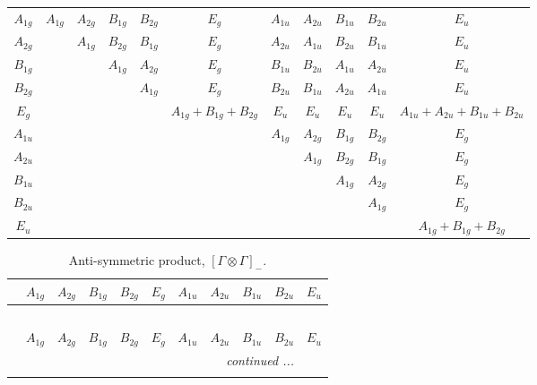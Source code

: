 \documentclass[fleqn,10pt,landscape]{article}
\begin{document}
\begin{itemize}
\begin{center}
\begin{longtable}{c|cccccccccc}
$ A_{1g} $ & $ A_{1g} $ & $ A_{2g} $ & $ B_{1g} $ & $ B_{2g} $ & $ E_{g} $ & $ A_{1u} $ & $ A_{2u} $ & $ B_{1u} $ & $ B_{2u} $ & $ E_{u} $ \\
$ A_{2g} $ & $  $ & $ A_{1g} $ & $ B_{2g} $ & $ B_{1g} $ & $ E_{g} $ & $ A_{2u} $ & $ A_{1u} $ & $ B_{2u} $ & $ B_{1u} $ & $ E_{u} $ \\
$ B_{1g} $ & $  $ & $  $ & $ A_{1g} $ & $ A_{2g} $ & $ E_{g} $ & $ B_{1u} $ & $ B_{2u} $ & $ A_{1u} $ & $ A_{2u} $ & $ E_{u} $ \\
$ B_{2g} $ & $  $ & $  $ & $  $ & $ A_{1g} $ & $ E_{g} $ & $ B_{2u} $ & $ B_{1u} $ & $ A_{2u} $ & $ A_{1u} $ & $ E_{u} $ \\
$ E_{g} $ & $  $ & $  $ & $  $ & $  $ & $ A_{1g} + B_{1g} + B_{2g} $ & $ E_{u} $ & $ E_{u} $ & $ E_{u} $ & $ E_{u} $ & $ A_{1u} + A_{2u} + B_{1u} + B_{2u} $ \\
$ A_{1u} $ & $  $ & $  $ & $  $ & $  $ & $  $ & $ A_{1g} $ & $ A_{2g} $ & $ B_{1g} $ & $ B_{2g} $ & $ E_{g} $ \\
$ A_{2u} $ & $  $ & $  $ & $  $ & $  $ & $  $ & $  $ & $ A_{1g} $ & $ B_{2g} $ & $ B_{1g} $ & $ E_{g} $ \\
$ B_{1u} $ & $  $ & $  $ & $  $ & $  $ & $  $ & $  $ & $  $ & $ A_{1g} $ & $ A_{2g} $ & $ E_{g} $ \\
$ B_{2u} $ & $  $ & $  $ & $  $ & $  $ & $  $ & $  $ & $  $ & $  $ & $ A_{1g} $ & $ E_{g} $ \\
$ E_{u} $ & $  $ & $  $ & $  $ & $  $ & $  $ & $  $ & $  $ & $  $ & $  $ & $ A_{1g} + B_{1g} + B_{2g} $ \\
\end{longtable}
\end{center}
\begin{center}
\renewcommand{\arraystretch}{1.0}
\begin{longtable}{ccccccccccc}
\caption{Anti-symmetric product, $[\Gamma\otimes\Gamma]_-$.}
 \\
 \hline \hline
 & $ A_{1g} $ & $ A_{2g} $ & $ B_{1g} $ & $ B_{2g} $ & $ E_{g} $ & $ A_{1u} $ & $ A_{2u} $ & $ B_{1u} $ & $ B_{2u} $ & $ E_{u} $ \\ \hline \endfirsthead

\multicolumn{10}{l}{\tablename\ \thetable{}} \\
 \hline \hline
 & $ A_{1g} $ & $ A_{2g} $ & $ B_{1g} $ & $ B_{2g} $ & $ E_{g} $ & $ A_{1u} $ & $ A_{2u} $ & $ B_{1u} $ & $ B_{2u} $ & $ E_{u} $ \\ \hline \endhead

 \hline \hline
\multicolumn{10}{r}{\footnotesize\it continued ...} \\ \endfoot


\end{longtable}
\end{center}
\end{itemize}
\end{document}
